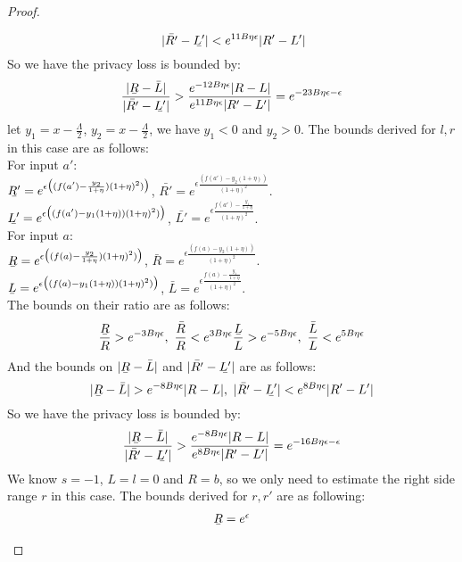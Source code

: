 \documentclass[a4paper,11pt]{article}
\begin{document}
\begin{proof}
\begin{itemize}
\[		~ |\bar{R'} - \ubar{L'}| < e^{11 B\eta \epsilon}|R' - L'|
		\]
		So we have the privacy loss is bounded by:
		\[
		\frac{|\ubar{R} - \bar{L}|}{|\bar{R'} - \ubar{L'}|}
		> \frac{e^{-12 B\eta \epsilon}|R - L|}{e^{11 B\eta \epsilon}|R' - L'|}
		= e^{-23B \eta \epsilon - \epsilon}
		\]
		let $y_1 = x - \frac{\Lambda}{2}$, $y_2 = x - \frac{\Lambda}{2}$, we have $y_1 < 0$ and $y_2 > 0$. The bounds derived for $l, r$ in this case are as follows:
		\\
		For input $a'$:
		\\
		$\ubar{R'} = e^{\epsilon 
				\big( (f(a') - \frac{y_2}{1 + \eta}) (1 + \eta)^2) \big)}$, 
		$\bar{R'} = e^{\epsilon 
				\frac{(f(a') - y_2(1 + \eta))}{(1 + \eta)^2}}$.
		\\
		$\ubar{L'} = e^{\epsilon 
				\big( (f(a') - y_1(1 + \eta)) (1 + \eta)^2) \big)}$, 
		$\bar{L'} = e^{\epsilon 
				\frac{f(a') - \frac{y_1}{1 + \eta}}{(1 + \eta)^2}}$.
		\\
		For input $a$:
		\\
		$\ubar{R} = e^{\epsilon 
				\big( (f(a) - \frac{y_2}{1 + \eta}) (1 + \eta)^2) \big)}$, 
		$\bar{R} = e^{\epsilon 
				\frac{(f(a) - y_2(1 + \eta))}{(1 + \eta)^2}}$.  
		\\
		$\ubar{L} = e^{\epsilon 
				\big( (f(a) - y_1(1 + \eta)) (1 + \eta)^2) \big)}$, 
		$\bar{L} = e^{\epsilon 
				\frac{f(a) - \frac{y_1}{1 + \eta}}{(1 + \eta)^2}}$.
		\\
		The bounds on their ratio are as follows:
		\[
		\frac{\ubar{R}}{R} > e^{-3B\eta \epsilon}, 
		~ \frac{\bar{R}}{R} < e^{3B\eta \epsilon}
		\frac{\ubar{L}}{L} > e^{-5B\eta \epsilon}, 
		~ \frac{\bar{L}}{L} < e^{5B\eta \epsilon}
		\]
		And the bounds on $|\ubar{R} - \bar{L}|$ and $|\bar{R'} - \ubar{L'}|$ are as follows:
		\[
		|\ubar{R} - \bar{L}| > e^{-8 B\eta \epsilon}|R - L|, 
		~ |\bar{R'} - \ubar{L'}| < e^{8 B\eta \epsilon}|R' - L'|
		\]
		So we have the privacy loss is bounded by:
		\[
		\frac{|\ubar{R} - \bar{L}|}{|\bar{R'} - \ubar{L'}|}
		> \frac{e^{-8 B\eta \epsilon}|R - L|}{e^{8 B\eta \epsilon}|R' - L'|}
		= e^{-16B \eta \epsilon - \epsilon}
		\]
		We know $s = -1$, $L = l = 0$ and $R = b$, so we only need to estimate the right side range $r$ in this case. The bounds derived for $r, r'$ are as following:
		\[
		\begin{array}{c}
		\ubar{R} = e^{\epsilon 
}
\end{array}\]
\end{itemize}
\end{proof}
\end{document}
